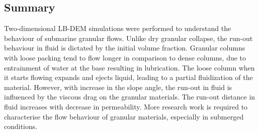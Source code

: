 \subsection{Summary}

Two-dimensional LB-DEM simulations were performed to understand the behaviour 
of submarine granular flows. Unlike dry granular collapse, the run-out 
behaviour in fluid is dictated by the initial volume fraction. Granular columns 
with loose packing tend to flow longer in comparison to dense columns, due to 
entrainment of water at the base resulting in lubrication. The loose column 
when it starts flowing expands and ejects liquid, leading to a partial 
fluidization of the material. However, with increase in the slope angle, the 
run-out in fluid is influenced by the viscous drag on the granular materials. 
The run-out distance in fluid increases with decrease in permeability. More 
research work is required to characterise the flow behaviour of granular 
materials, especially in submerged conditions.
